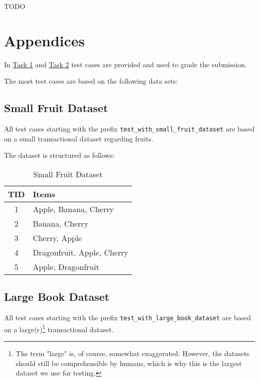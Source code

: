 \documentclass[
english,
smallborders
]{i6prcsht}
\begin{document}
TODO

\newpage

\section*{Appendices}

In \hyperref[sec:task-one]{Task 1} and \hyperref[sec:task-one]{Task 2} test cases are provided and used to grade the submission.

The most test cases are based on the following data sets:

\subsection*{Small Fruit Dataset}

All test cases starting with the prefix \texttt{test\_with\_small\_fruit\_dataset} are based on a small transactional dataset regarding fruits.

The dataset is structured as follows:

\vspace*{1cm}

\begin{table}[ht]
	\centering
	\begin{tabular}{|c|l|}
		\hline
		\textbf{TID} & \textbf{Items}             \\
		\hline
		1            & Apple, Banana, Cherry      \\
		\hline
		2            & Banana, Cherry             \\
		\hline
		3            & Cherry, Apple              \\
		\hline
		4            & Dragonfruit, Apple, Cherry \\
		\hline
		5            & Apple, Dragonfruit         \\
		\hline
	\end{tabular}
	\caption{Small Fruit Dataset}
	\label{tab:small-fruit-dataset}
\end{table}

\vspace*{1cm}

\subsection*{Large Book Dataset}

All test cases starting with the prefix \texttt{test\_with\_large\_book\_dataset} are based on a large(r)\footnote{The term "large" is, of course, somewhat exaggerated. However, the datasets should still be comprehensible by humans, which is why this is the largest dataset we use for testing.} transactional dataset.
\end{document}
